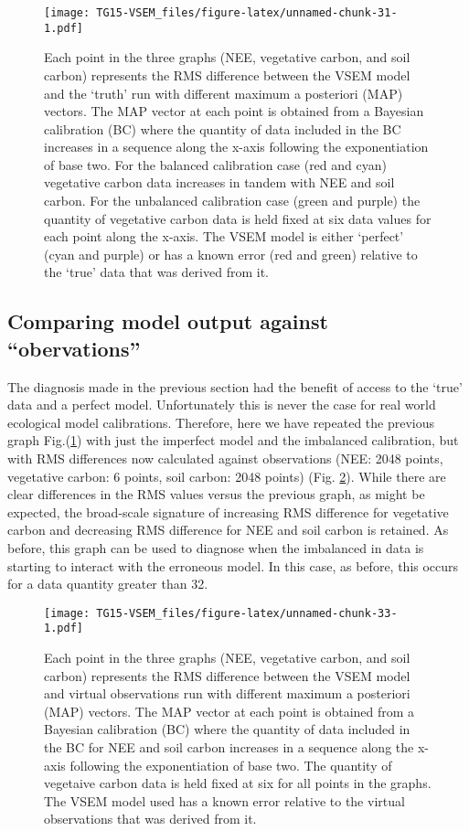 \documentclass[]{article}
\begin{document}
\begin{figure}
\centering
\texttt{[image: TG15-VSEM\_files/figure-latex/unnamed-chunk-31-1.pdf]}
\caption{\label{fig:rmsMAPTruth}Each point in the three graphs (NEE,
vegetative carbon, and soil carbon) represents the RMS difference
between the VSEM model and the `truth' run with different maximum a
posteriori (MAP) vectors. The MAP vector at each point is obtained from
a Bayesian calibration (BC) where the quantity of data included in the
BC increases in a sequence along the x-axis following the exponentiation
of base two. For the balanced calibration case (red and cyan) vegetative
carbon data increases in tandem with NEE and soil carbon. For the
unbalanced calibration case (green and purple) the quantity of
vegetative carbon data is held fixed at six data values for each point
along the x-axis. The VSEM model is either `perfect' (cyan and purple)
or has a known error (red and green) relative to the `true' data that
was derived from it.}
\end{figure}

\subsection{\texorpdfstring{Comparing model output against
``obervations''}{Comparing model output against obervations}}\label{comparing-model-output-against-obervations}

The diagnosis made in the previous section had the benefit of access to
the `true' data and a perfect model. Unfortunately this is never the
case for real world ecological model calibrations. Therefore, here we
have repeated the previous graph Fig.(\ref{fig:rmsMAPTruth}) with just
the imperfect model and the imbalanced calibration, but with RMS
differences now calculated against observations (NEE: 2048 points,
vegetative carbon: 6 points, soil carbon: 2048 points) (Fig.
\ref{fig:rmsMAPObs}). While there are clear differences in the RMS
values versus the previous graph, as might be expected, the broad-scale
signature of increasing RMS difference for vegetative carbon and
decreasing RMS difference for NEE and soil carbon is retained. As
before, this graph can be used to diagnose when the imbalanced in data
is starting to interact with the erroneous model. In this case, as
before, this occurs for a data quantity greater than 32.

\begin{figure}
\centering
\texttt{[image: TG15-VSEM\_files/figure-latex/unnamed-chunk-33-1.pdf]}
\caption{\label{fig:rmsMAPObs}Each point in the three graphs (NEE,
vegetative carbon, and soil carbon) represents the RMS difference
between the VSEM model and virtual observations run with different
maximum a posteriori (MAP) vectors. The MAP vector at each point is
obtained from a Bayesian calibration (BC) where the quantity of data
included in the BC for NEE and soil carbon increases in a sequence along
the x-axis following the exponentiation of base two. The quantity of
vegetaive carbon data is held fixed at six for all points in the graphs.
The VSEM model used has a known error relative to the virtual
observations that was derived from it.}
\end{figure}
\end{document}
